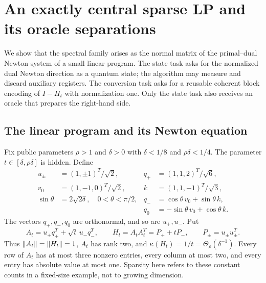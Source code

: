 \section{An exactly central sparse LP and its oracle separations}\label{sec:lp}
We show that the spectral family arises as the normal matrix of the primal--dual Newton system of a small linear program. The state task asks for the normalized dual Newton direction as a quantum state; the algorithm may measure and discard auxiliary registers. The conversion task asks for a reusable coherent block encoding of $I-H_t$ with normalization one. Only the state task also receives an oracle that prepares the right-hand side.

\subsection{The linear program and its Newton equation}
Fix public parameters $\rho>1$ and $\delta>0$ with $\delta<1/8$ and $\rho\delta<1/4$. The parameter $t\in[\delta,\rho\delta]$ is hidden. Define
\begin{align*}
 u_\pm&=(1,\pm1)^T/\sqrt2,& q_+&=(1,1,2)^T/\sqrt6,\\
 v_0&=(1,-1,0)^T/\sqrt2,& k&=(1,1,-1)^T/\sqrt3,\\
 \sin\theta&=2\sqrt{2\delta},\quad 0<\theta<\pi/2,&
 q_-&=\cos\theta\,v_0+\sin\theta\,k,\\
 &&q_0&=-\sin\theta\,v_0+\cos\theta\,k.
\end{align*}
The vectors $q_+,q_-,q_0$ are orthonormal, and so are $u_+,u_-$. Put
\begin{equation}\label{eq:lp-family}
 A_t=u_+q_+^T+\sqrt t\,u_-q_-^T,\qquad
 H_t=A_tA_t^T=P_++tP_-,\qquad P_\pm=u_\pm u_\pm^T.
\end{equation}
Thus $\left\lVert A_t\right\rVert=\left\lVert H_t\right\rVert=1$, $A_t$ has rank two, and $\kappa(H_t)=1/t=\Theta_\rho(\delta^{-1})$. Every row of $A_t$ has at most three nonzero entries, every column at most two, and every entry has absolute value at most one. Sparsity here refers to these constant counts in a fixed-size example, not to growing dimension.

